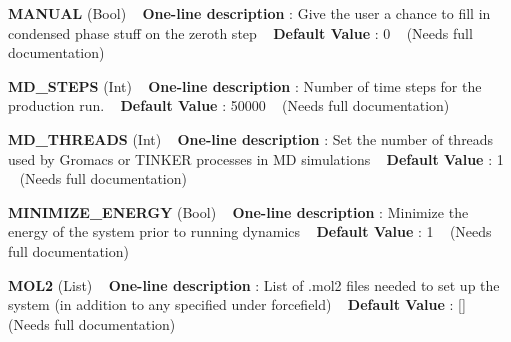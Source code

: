 \begin{DoxyItemize}
\item {\bfseries  M\+A\+N\+U\+AL } (Bool) ~\newline
{\bfseries  One-\/line description }\+: Give the user a chance to fill in condensed phase stuff on the zeroth step ~\newline
{\bfseries  Default Value }\+: 0 ~\newline
(Needs full documentation)\end{DoxyItemize}
\begin{DoxyItemize}
\item {\bfseries  M\+D\+\_\+\+S\+T\+E\+PS } (Int) ~\newline
{\bfseries  One-\/line description }\+: Number of time steps for the production run. ~\newline
{\bfseries  Default Value }\+: 50000 ~\newline
(Needs full documentation)\end{DoxyItemize}
\begin{DoxyItemize}
\item {\bfseries  M\+D\+\_\+\+T\+H\+R\+E\+A\+DS } (Int) ~\newline
{\bfseries  One-\/line description }\+: Set the number of threads used by Gromacs or T\+I\+N\+K\+ER processes in MD simulations ~\newline
{\bfseries  Default Value }\+: 1 ~\newline
(Needs full documentation)\end{DoxyItemize}
\begin{DoxyItemize}
\item {\bfseries  M\+I\+N\+I\+M\+I\+Z\+E\+\_\+\+E\+N\+E\+R\+GY } (Bool) ~\newline
{\bfseries  One-\/line description }\+: Minimize the energy of the system prior to running dynamics ~\newline
{\bfseries  Default Value }\+: 1 ~\newline
(Needs full documentation)\end{DoxyItemize}
\begin{DoxyItemize}
\item {\bfseries  M\+O\+L2 } (List) ~\newline
{\bfseries  One-\/line description }\+: List of .mol2 files needed to set up the system (in addition to any specified under forcefield) ~\newline
{\bfseries  Default Value }\+: \mbox{[}\mbox{]} ~\newline
(Needs full documentation)\end{DoxyItemize}
